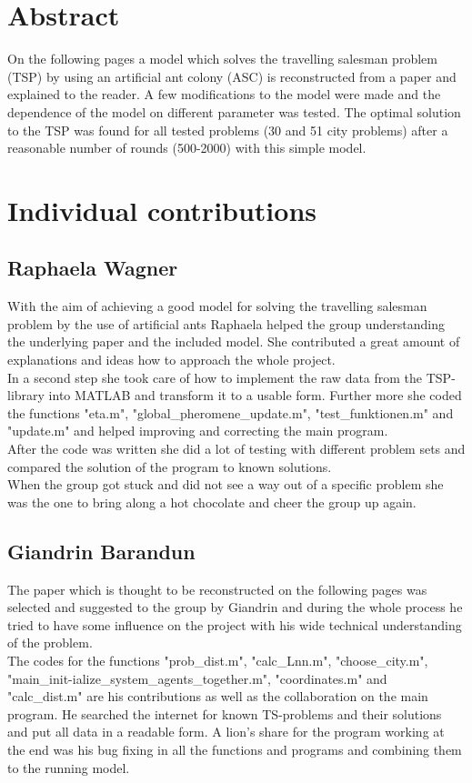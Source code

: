 \documentclass[11pt]{article}
\begin{document}
\newpage
\setcounter{page}{1}




\section{Abstract}
On the following pages a model which solves the travelling salesman problem (TSP) by using an artificial ant colony (ASC) is reconstructed from a paper and explained to the reader. A few modifications to the model were made and the dependence of the model on different parameter was tested. The optimal solution to the TSP was found for all tested problems (30 and 51 city problems) after a reasonable number of rounds (500-2000) with this simple model.
\section{Individual contributions}
\subsection{Raphaela Wagner}
With the aim of achieving a good model for solving the travelling salesman problem by the use of artificial ants Raphaela helped the group understanding the underlying paper and the included model. She contributed a great amount of explanations and ideas how to approach the whole project. \\
In a second step she took care of how to implement the raw data from the TSP-library into MATLAB and transform it to a usable form. Further more she coded the functions "eta.m", "global\_pheromene\_update.m", "test\_funktionen.m" and "update.m" and helped improving and correcting the main program. \\
After the code was written she did a lot of testing with different problem sets and compared the solution of the program to known solutions. \\
When the group got stuck and did not see a way out of a specific problem she was the one to bring along a hot chocolate and cheer the group up again.

\subsection{Giandrin Barandun}
The paper which is thought to be reconstructed on the following pages was selected and suggested to the group by Giandrin and during the whole process he tried to have some influence on the project with his wide technical understanding of the problem. \\
The codes for the functions "prob\_dist.m", "calc\_Lnn.m", "choose\_city.m", "main\_init-ialize\_system\_agents\_together.m", "coordinates.m" and "calc\_dist.m" are his contributions as well as the collaboration on the main program. He searched the internet for known TS-problems and their solutions and put all data in a readable form. A lion's share for the program working at the end was his bug fixing in all the functions and programs and combining them to the running model.
\end{document}
